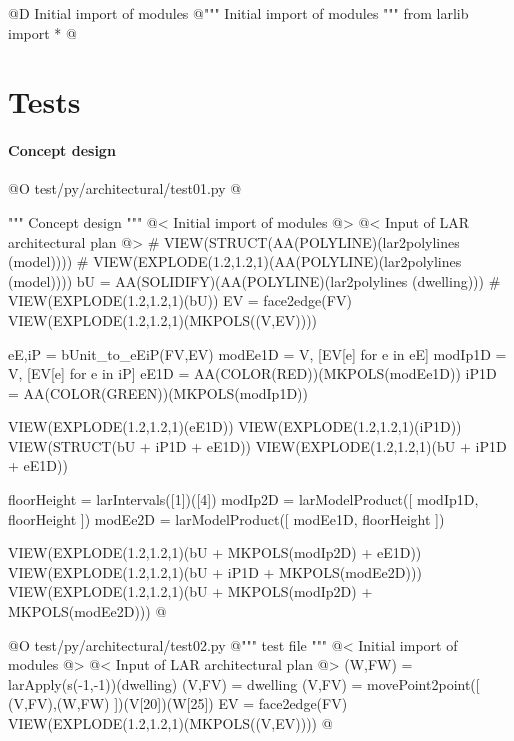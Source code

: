 \documentclass[11pt,oneside]{article}    %
\begin{document}
@D Initial import of modules
@{""" Initial import of modules """
from larlib import *
@}

\section{Tests}


\paragraph{Concept design}

@O test/py/architectural/test01.py
@{""" Concept design """
@< Initial import of modules @>
@< Input of LAR architectural plan @>
# VIEW(STRUCT(AA(POLYLINE)(lar2polylines (model))))
# VIEW(EXPLODE(1.2,1.2,1)(AA(POLYLINE)(lar2polylines (model))))
bU = AA(SOLIDIFY)(AA(POLYLINE)(lar2polylines (dwelling)))
# VIEW(EXPLODE(1.2,1.2,1)(bU))
EV = face2edge(FV)
VIEW(EXPLODE(1.2,1.2,1)(MKPOLS((V,EV))))

eE,iP = bUnit_to_eEiP(FV,EV)
modEe1D = V, [EV[e] for e in eE]
modIp1D = V, [EV[e] for e in iP]
eE1D = AA(COLOR(RED))(MKPOLS(modEe1D))
iP1D = AA(COLOR(GREEN))(MKPOLS(modIp1D))

VIEW(EXPLODE(1.2,1.2,1)(eE1D))
VIEW(EXPLODE(1.2,1.2,1)(iP1D))
VIEW(STRUCT(bU + iP1D + eE1D))
VIEW(EXPLODE(1.2,1.2,1)(bU + iP1D + eE1D))

floorHeight = larIntervals([1])([4])
modIp2D = larModelProduct([ modIp1D, floorHeight ])
modEe2D = larModelProduct([ modEe1D, floorHeight ])

VIEW(EXPLODE(1.2,1.2,1)(bU + MKPOLS(modIp2D) + eE1D))
VIEW(EXPLODE(1.2,1.2,1)(bU + iP1D + MKPOLS(modEe2D)))
VIEW(EXPLODE(1.2,1.2,1)(bU + MKPOLS(modIp2D) + MKPOLS(modEe2D)))
@}



@O test/py/architectural/test02.py
@{""" test file """
@< Initial import of modules @>
@< Input of LAR architectural plan @>
(W,FW) = larApply(s(-1,-1))(dwelling)
(V,FV) = dwelling
(V,FV) = movePoint2point([ (V,FV),(W,FW) ])(V[20])(W[25])
EV = face2edge(FV)
VIEW(EXPLODE(1.2,1.2,1)(MKPOLS((V,EV))))
@}
\end{document}
